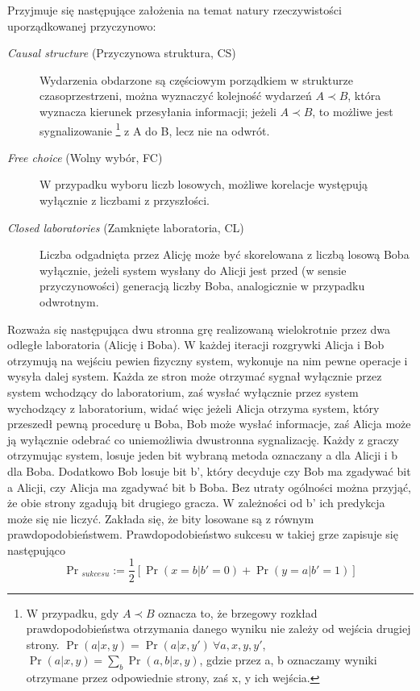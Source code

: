 \documentclass[10pt]{article} %
\begin{document}
Przyjmuje się następujące założenia na temat natury rzeczywistości uporządkowanej przyczynowo:
\begin{description}
	\item[\textit{Causal structure} (Przyczynowa struktura, CS)]
	Wydarzenia obdarzone są częściowym porządkiem w strukturze czasoprzestrzeni, można wyznaczyć kolejność wydarzeń $A \prec B$, która wyznacza kierunek przesyłania informacji; jeżeli $A \prec B$, to możliwe jest sygnalizowanie
	\footnote
	{W przypadku, gdy $A \prec B$ oznacza to, że brzegowy rozkład prawdopodobieństwa otrzymania danego wyniku nie zależy od wejścia drugiej strony. $\Pr(a|x, y) = \Pr(a|x, y')~\forall a,x,y,y'$, $\Pr(a|x,y) = \sum_b \Pr(a,b|x,y)$, gdzie przez a, b oznaczamy wyniki otrzymane przez odpowiednie strony, zaś x, y ich wejścia.} 
	z A do B, lecz nie na odwrót.
	\item[\textit{Free choice} (Wolny wybór, FC)]  
	W przypadku wyboru liczb losowych, możliwe korelacje występują wyłącznie z liczbami z przyszłości.
	\item[\textit{Closed laboratories} (Zamknięte laboratoria, CL)] 
	Liczba odgadnięta przez Alicję może być skorelowana z liczbą losową Boba wyłącznie, jeżeli system wysłany do Alicji jest przed (w sensie przyczynowości) generacją liczby Boba, analogicznie w przypadku odwrotnym.	
\end{description}
Rozważa się następująca dwu stronna grę realizowaną wielokrotnie przez dwa odległe laboratoria (Alicję i Boba). W każdej iteracji rozgrywki Alicja i Bob otrzymują na wejściu pewien fizyczny system, wykonuje na nim pewne operacje i wysyła dalej system. Każda ze stron może otrzymać sygnał wyłącznie przez 
system wchodzący do laboratorium, zaś wysłać wyłącznie przez system wychodzący z laboratorium, widać więc jeżeli Alicja otrzyma system, który przeszedł pewną procedurę u Boba, Bob może wysłać informacje, zaś Alicja może ją wyłącznie odebrać co uniemożliwia dwustronna sygnalizację.
Każdy z graczy otrzymując system, losuje jeden bit wybraną metoda oznaczany a dla Alicji i b dla Boba. Dodatkowo Bob losuje bit b', który decyduje czy Bob ma zgadywać bit a Alicji, czy Alicja ma zgadywać bit b Boba. Bez utraty ogólności można przyjąć, że obie strony zgadują bit drugiego gracza. W zależności od b' ich 
predykcja może się nie liczyć. Zakłada się, że bity losowane są z równym prawdopodobieństwem. Prawdopodobieństwo sukcesu w takiej grze zapisuje się następująco
\begin{equation}
\Pr{}_{sukcesu} := \frac{1}{2} \left[ \Pr(x=b|b'=0) + \Pr(y=a|b' = 1)\right]
\end{equation}
\end{document}
